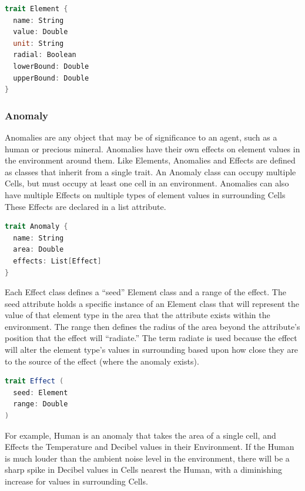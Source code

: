 \begin{lstlisting}[language=Scala]
trait Element {
  name: String
  value: Double
  unit: String
  radial: Boolean
  lowerBound: Double
  upperBound: Double
}
\end{lstlisting}



\subsubsection{Anomaly} \label{subsec:anomaly}
Anomalies are any object that may be of significance to an agent, such as a human or precious mineral.
Anomalies have their own effects on element values in the environment around them.
Like Elements, Anomalies and Effects are defined as classes that inherit from a single trait.
An Anomaly class can occupy multiple Cells, but must occupy at least one cell in an environment.
Anomalies can also have multiple Effects on multiple types of element values in surrounding Cells
These Effects are declared in a list attribute.

\begin{lstlisting}[language=Scala]
trait Anomaly {
  name: String
  area: Double
  effects: List[Effect]
}
\end{lstlisting}

Each Effect class defines a ``seed'' Element class and a range of the effect.
The seed attribute holds a specific instance of an Element class that will represent the value of that element type in the area that the attribute exists within the environment.
The range then defines the radius of the area beyond the attribute's position that the effect will ``radiate.''
The term radiate is used because the effect will alter the element type's values in surrounding based upon how close they are to the source of the effect (where the anomaly exists).

\begin{lstlisting}[language=Scala]
trait Effect (
  seed: Element
  range: Double
)
\end{lstlisting}

For example, Human is an anomaly that takes the area of a single cell, and Effects the Temperature and Decibel values in their Environment.
If the Human is much louder than the ambient noise level in the environment, there will be a sharp spike in Decibel values in Cells nearest the Human, with a diminishing increase for values in surrounding Cells.


